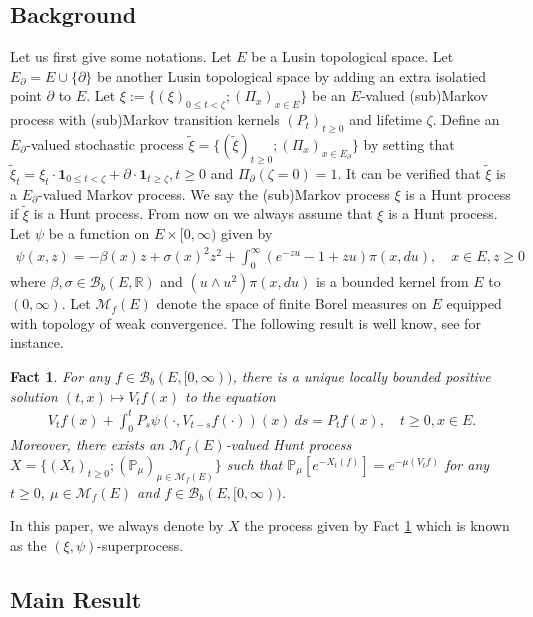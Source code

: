 \documentclass[12pt,a4paper]{amsart}
\numberwithin{equation}{section}
\theoremstyle{plain}
\newtheorem{fact}[thm]{Fact}
\theoremstyle{definition}
\theoremstyle{remark}
\newcounter{N}
\newcounter{n}[N]
\begin{document}
\subsection{Background} \label{sec:BGD}
Let us first give some notations.
Let $E$ be a Lusin topological space. 
Let $E_\partial = E\cup\{\partial\} $ be another Lusin topological space by adding an extra isolatied point $\partial$ to $E$. 
Let $\xi:= \{(\xi)_{0\leq t < \zeta}; (\Pi_x)_{x\in E}\}$ be an $E$-valued (sub)Markov process with (sub)Markov transition kernels $(P_t)_{t\geq 0}$ and lifetime $\zeta$. 
Define an $E_\partial$-valued stochastic process $\tilde \xi = \{(\tilde \xi)_{t\geq 0} ; (\Pi_{x})_{x\in {E_\partial}}\} $ by setting that $\tilde \xi_t = \xi_t\cdot \mathbf 1_{0\leq t< \zeta} + \partial \cdot \mathbf 1_{t\geq \zeta}, t\geq 0$ and $\Pi_\partial (\zeta = 0) = 1$. 
It can be verified that $\tilde \xi$ is a $E_\partial$-valued Markov process. 
We say the (sub)Markov process $\xi$ is a Hunt process if $\tilde \xi$ is a Hunt process. 
From now on we always assume that $\xi$ is a Hunt process. 
Let $\psi$ be a function on $E \times [0,\infty)$ given by 
\begin{align} 
\psi(x,z) 
= -\beta(x) z + \sigma(x)^2 z^2 + \int_0^\infty (e^{-zu} -1 + zu) \pi(x,du),
\quad x\in E, z\geq 0 
\end{align} 
where $\beta, \sigma \in \mathcal B_b(E,\mathbb R)$ and $(u \wedge u^2) \pi(x,du)$ is a bounded kernel from $E$ to $(0,\infty)$. 
Let $\mathcal M_f(E)$ denote the space of finite Borel measures on $E$ equipped with topology of weak convergence. 
The following result is well know, see \cite{Li2011MeasureValued} for instance.
\begin{fact} \label{Fact:S!} 
For any $f \in \mathcal B_b(E, [0,\infty))$, there is a unique locally bounded positive solution $(t,x)\mapsto V_tf(x)$ to the equation
\begin{align} 
V_tf(x) + \int_0^t P_{s} \psi(\cdot, V_{t-s}f(\cdot)) (x)~ds 
= P_tf(x), \quad t\geq 0, x\in E. 
\end{align}
Moreover, there exists an $\mathcal M_f(E)$-valued Hunt process $X =\{(X_t)_{t\geq 0}; (\mathbb P_\mu)_{\mu \in \mathcal M_f(E)}\}$ such that  $\mathbb P_\mu[e^{- X_t(f)}]  = e^{- \mu(V_tf)}$ for any $t\geq 0,~\mu \in \mathcal M_f(E)$ and $f \in \mathcal B_b(E,[0,\infty))$. 
\end{fact}
In this paper, we always denote by $X$ the process given by Fact \ref{Fact:S!} which is known as the $(\xi, \psi)$-superprocess.
\subsection{Main Result} \label{sec:MR}
\end{document}
